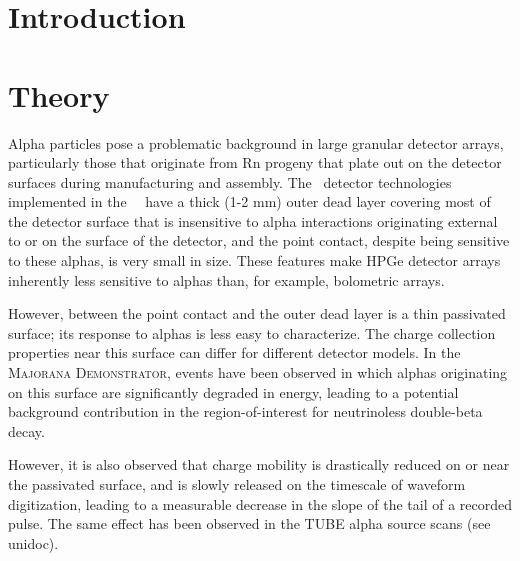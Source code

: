 \documentclass[groupedaddress,rmp,amsmath,amssymb,bibnotes,altaffilletter,twocolumn]{revtex4-1}
\begin{document}
\pagestyle{uniheader}

\date{\today}
\maketitle
\thispagestyle{uniheader}
\tableofcontents

\section{Introduction}


\section{Theory}
Alpha particles pose a problematic background in large granular detector arrays, particularly those that originate from Rn progeny that plate out on the detector surfaces during manufacturing and assembly. The \ppc\ detector technologies implemented in the \MJ\ \DEM\ have a thick (1-2 mm) outer dead layer covering most of the detector surface that is insensitive to alpha interactions originating external to or on the surface of the detector, and the point contact, despite being sensitive to these alphas, is very small in size. These features make HPGe detector arrays inherently less sensitive to alphas than, for example, bolometric arrays. 

However, between the point contact and the outer dead layer is a thin passivated surface; its response to alphas is less easy to characterize. The charge collection properties near this surface can differ for different detector models. In the \textsc{Majorana Demonstrator}, events have been observed in which alphas originating on this surface are significantly degraded in energy, leading to a potential background contribution in the region-of-interest for neutrinoless double-beta decay. 

However, it is also observed that charge mobility is drastically reduced on or near the passivated surface, and is slowly released on the timescale of waveform digitization, leading to a measurable decrease in the slope of the tail of a recorded pulse. The same effect has been observed in the TUBE alpha source scans (see unidoc).
\end{document}
